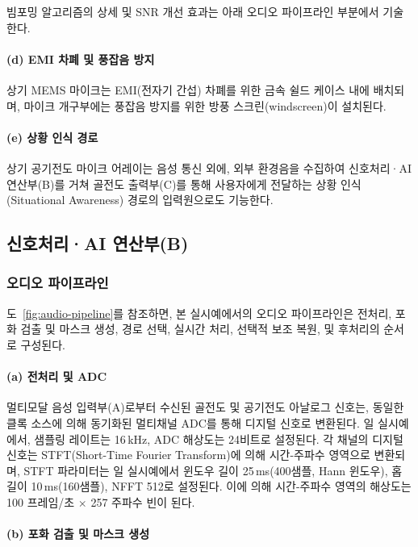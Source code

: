 \documentclass{article}
\begin{document}
빔포밍 알고리즘의 상세 및 SNR 개선 효과는 아래 오디오 파이프라인 부분에서 기술한다.

\paragraph{(d) EMI 차폐 및 풍잡음 방지}

상기 MEMS 마이크는 EMI(전자기 간섭) 차폐를 위한 금속 쉴드 케이스 내에 배치되며, 마이크 개구부에는 풍잡음 방지를 위한 방풍 스크린(windscreen)이 설치된다.

\paragraph{(e) 상황 인식 경로}

상기 공기전도 마이크 어레이는 음성 통신 외에, 외부 환경음을 수집하여 신호처리·AI 연산부(B)를 거쳐 골전도 출력부(C)를 통해 사용자에게 전달하는 상황 인식(Situational Awareness) 경로의 입력원으로도 기능한다.

\subsection{신호처리·AI 연산부(B)}

\subsubsection{오디오 파이프라인}

도~\ref{fig:audio-pipeline}를 참조하면, 본 실시예에서의 오디오 파이프라인은 전처리, 포화 검출 및 마스크 생성, 경로 선택, 실시간 처리, 선택적 보조 복원, 및 후처리의 순서로 구성된다.

\paragraph{(a) 전처리 및 ADC}

멀티모달 음성 입력부(A)로부터 수신된 골전도 및 공기전도 아날로그 신호는, 동일한 클록 소스에 의해 동기화된 멀티채널 ADC를 통해 디지털 신호로 변환된다. 일 실시예에서, 샘플링 레이트는 16\,kHz, ADC 해상도는 24비트로 설정된다. 각 채널의 디지털 신호는 STFT(Short-Time Fourier Transform)에 의해 시간-주파수 영역으로 변환되며, STFT 파라미터는 일 실시예에서 윈도우 길이 25\,ms(400샘플, Hann 윈도우), 홉 길이 10\,ms(160샘플), NFFT 512로 설정된다. 이에 의해 시간-주파수 영역의 해상도는 100 프레임/초 $\times$ 257 주파수 빈이 된다.

\paragraph{(b) 포화 검출 및 마스크 생성}
\end{document}
